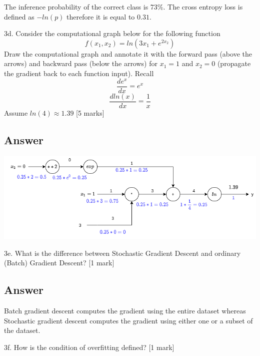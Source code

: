 \documentclass[
	12pt, %
]{fphw}
\begin{document}
The inference probability of the correct class is 73\%.
The cross entropy loss is defined as $-ln(p)$ therefore it is equal to $0.31$.
\begin{problem}
3d. Consider the computational graph below for the following function
\begin{equation}
	f(x_1, x_2) = ln(3x_1+e^{2x_2})
\end{equation}
Draw the computational graph and annotate it with the forward pass (above the arrows)
and backward pass (below the arrows) for $x_1=1$ and $x_2=0$ (propagate the gradient
back to each function input). Recall
\begin{equation}
	\frac{de^x}{dx} = e^x
\end{equation}
\begin{equation}
	\frac{dln(x)}{dx} = \frac{1}{x}
\end{equation}
Assume $ln(4) \approx 1.39$ [5 marks]
\end{problem}
\subsection*{Answer}
\begin{center}
	\includegraphics[width=1\columnwidth, page=1]{3d.png} %
\end{center}
\begin{problem}
3e. What is the difference between Stochastic Gradient Descent and ordinary (Batch)
Gradient Descent? [1 mark]
\end{problem}
\subsection*{Answer}
Batch gradient descent computes the gradient using the entire dataset 
whereas Stochastic gradient descent computes the gradient using either one or a subset of the dataset.
\begin{problem}
3f. How is the condition of overfitting defined? [1 mark]
\end{problem}
\end{document}
